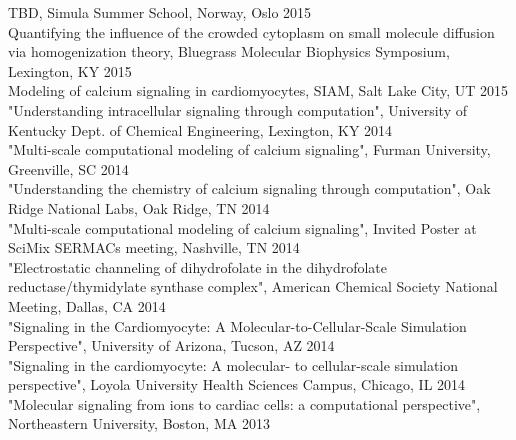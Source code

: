 \documentclass{res} %
\begin{document}
\begin{resume}
\vspace{15pt} %

TBD, Simula Summer School, Norway, Oslo  \hfill 2015 \\

Quantifying the influence of the crowded cytoplasm on small molecule diffusion via homogenization theory, Bluegrass Molecular Biophysics Symposium, Lexington, KY  \hfill 2015 \\

Modeling of calcium signaling in cardiomyocytes, SIAM, Salt Lake City, UT \hfill 2015 \\

"Understanding intracellular signaling through computation", University of Kentucky Dept. of Chemical Engineering, Lexington, KY \hfill 2014 \\

"Multi-scale computational modeling of calcium signaling", Furman University, Greenville, SC  \hfill 2014 \\

"Understanding the chemistry of calcium signaling through computation", Oak Ridge National Labs, Oak Ridge, TN \hfill 2014 \\

"Multi-scale computational modeling of calcium signaling", Invited Poster at SciMix SERMACs meeting, Nashville, TN \hfill 2014 \\

"Electrostatic channeling of dihydrofolate in the dihydrofolate reductase/thymidylate synthase complex", American Chemical Society National Meeting, Dallas, CA \hfill 2014 \\

"Signaling in the Cardiomyocyte: A Molecular-to-Cellular-Scale Simulation Perspective", University of Arizona, Tucson, AZ \hfill 2014 \\

"Signaling in the cardiomyocyte: A molecular- to cellular-scale simulation perspective", Loyola University Health Sciences Campus, Chicago, IL \hfill 2014 \\

"Molecular signaling from ions to cardiac cells: a computational perspective", Northeastern University, Boston, MA \hfill 2013 \\


\end{resume}
\end{document}
